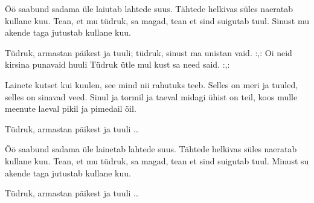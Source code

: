\"O\"o saabund sadama \"ule
laiutab lahtede suus.
T\"ahtede helkivas s\"ules
naeratab kullane kuu.
Tean, et mu t\"udruk, sa magad,
tean et sind suigutab tuul.
Sinust mu akende taga
jutustab kullane kuu.

T\"udruk, armastan p\"aikest ja tuuli;
t\"udruk, sinust ma unistan vaid.
:,: Oi neid kirsina punavaid huuli
T\"udruk \"utle mul kust sa need said. :,:

Lainete kutset kui kuulen,
see mind nii rahutuks teeb.
Selles on meri ja tuuled,
selles on sinavad veed.
Sinul ja tormil ja taeval
midagi \"uhist on teil,
koos mulle meenute laeval
pikil ja pimedail \"oil.

T\"udruk, armastan p\"aikest ja tuuli \ldots

\"O\"o saabund sadama \"ule
lainetab lahtede suus.
T\"ahtede helkivas s\"ules
naeratab kullane kuu.
Tean, et mu t\"udruk, sa magad,
tean et sind suigutab tuul.
Minust su akende taga
jutustab kullane kuu.

T\"udruk, armastan p\"aikest ja tuuli \ldots